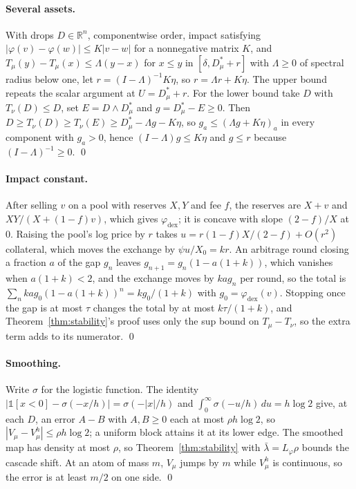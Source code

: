 \documentclass[letterpaper]{article} %
\theoremstyle{remark}
\newcommand{\Dstar}[1]{D^{\ast}_{#1}}
\newcommand{\Lp}{L_\varphi}
\newcommand{\lb}{\bar\lambda}
\newcommand{\R}{\mathbb{R}}
\begin{document}
\paragraph{Several assets.} With drops $D\in\R^n$, componentwise order, impact satisfying $|\varphi(v)-\varphi(w)|\le K|v-w|$ for a nonnegative matrix $K$, and $T_\mu(y)-T_\mu(x)\le\Lambda(y-x)$ for $x\le y$ in $[\delta,\Dstar{\mu}+r]$ with $\Lambda\ge0$ of spectral radius below one, let $r=(I-\Lambda)^{-1}K\eta$, so $r=\Lambda r+K\eta$. The upper bound repeats the scalar argument at $U=\Dstar{\mu}+r$. For the lower bound take $D$ with $T_\nu(D)\le D$, set $E=D\wedge\Dstar{\mu}$ and $g=\Dstar{\mu}-E\ge0$. Then $D\ge T_\nu(D)\ge T_\nu(E)\ge\Dstar{\mu}-\Lambda g-K\eta$, so $g_a\le(\Lambda g+K\eta)_a$ in every component with $g_a>0$, hence $(I-\Lambda)g\le K\eta$ and $g\le r$ because $(I-\Lambda)^{-1}\ge0$. \qed

\paragraph{Impact constant.} After selling $v$ on a pool with reserves $X,Y$ and fee $f$, the reserves are $X+v$ and $XY/(X+(1-f)v)$, which gives $\varphi_{\mathrm{dex}}$; it is concave with slope $(2-f)/X$ at $0$. Raising the pool's log price by $r$ takes $u=r(1-f)X/(2-f)+O(r^2)$ collateral, which moves the exchange by $\psi u/X_0=kr$. An arbitrage round closing a fraction $a$ of the gap $g_n$ leaves $g_{n+1}=g_n(1-a(1+k))$, which vanishes when $a(1+k)<2$, and the exchange moves by $kag_n$ per round, so the total is $\sum_n kag_0(1-a(1+k))^n=kg_0/(1+k)$ with $g_0=\varphi_{\mathrm{dex}}(v)$. Stopping once the gap is at most $\tau$ changes the total by at most $k\tau/(1+k)$, and Theorem~\ref{thm:stability}'s proof uses only the sup bound on $T_\mu-T_\nu$, so the extra term adds to its numerator. \qed

\paragraph{Smoothing.} Write $\sigma$ for the logistic function. The identity $|\mathbb{1}[x<0]-\sigma(-x/h)|=\sigma(-|x|/h)$ and $\int_0^\infty\sigma(-u/h)\,du=h\log2$ give, at each $D$, an error $A-B$ with $A,B\ge0$ each at most $\rho h\log2$, so $|V_\mu-V^h_\mu|\le\rho h\log2$; a uniform block attains it at its lower edge. The smoothed map has density at most $\rho$, so Theorem~\ref{thm:stability} with $\lb=\Lp\rho$ bounds the cascade shift. At an atom of mass $m$, $V_\mu$ jumps by $m$ while $V^h_\mu$ is continuous, so the error is at least $m/2$ on one side. \qed
\end{document}
